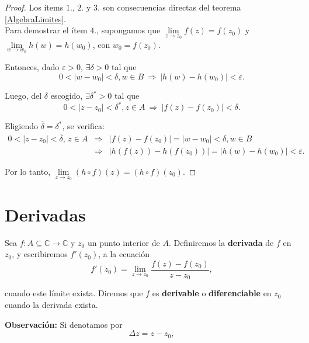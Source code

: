 \begin{proof}
Los ítems $1.$, $2.$ y $3.$ son consecuencias directas del teorema \ref{AlgebraLimites}.
\\

Para demostrar el ítem $4.$, supongamos que $\lim\limits_{z \to z_0} f(z) = f(z_0)$ y $\lim\limits_{w \to w_0} h(w) = h(w_0)$, con $w_0 = f(z_0)$. 

Entonces, dado $\varepsilon > 0$, $\exists \delta >0$ tal que
\begin{equation*}
 0 < |w-w_0| < \delta, w \in B ~\Rightarrow~ |h(w) - h(w_0)| < \varepsilon.
\end{equation*}

Luego, del $\delta$ escogido, $\exists \delta^* >0$ tal que
\begin{equation*}
 0 < |z-z_0| < \delta^*, z \in A ~\Rightarrow~ |f(z) - f(z_0)| < \delta.
\end{equation*}

Eligiendo $\bar{\delta} = \delta^*$, se verifica:
\begin{eqnarray*}
 0 < |z-z_0| < \bar{\delta}, \, z \in A &\Rightarrow &  |f(z) - f(z_0)| = |w-w_0| < \delta, w \in B  \\
 &\Rightarrow & |h(f(z)) - h(f(z_0))| = |h(w) - h(w_0)| < \varepsilon .
\end{eqnarray*}

Por lo tanto, $\lim\limits_{z \to z_0} (h\circ f)(z) = (h \circ f)(z_0)$.

\end{proof}

\section{Derivadas}

\begin{defi}
Sea $f: A \subseteq \mathbb{C} \rightarrow \mathbb{C}$ y $z_0$ un punto interior de $A$. Definiremos la \textbf{derivada} de $f$ en $z_0$, y escribiremos $f'(z_0)$, a la ecuación
\begin{equation}
f'(z_0) = \lim_{z \to z_0} \frac{f(z) - f(z_0)}{z-z_0},\label{derivada}
\end{equation}

cuando este límite exista. Diremos que $f$ es \textbf{derivable} o \textbf{diferenciable} en $z_0$ cuando la derivada exista.
\end{defi}

\textbf{Observación:} Si denotamos por
$$\Delta z = z-z_0,$$

